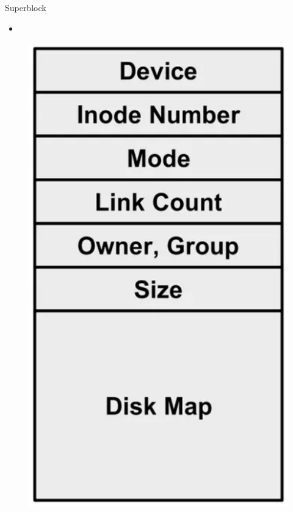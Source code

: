 \documentclass[xcolor=table]{beamer}
\begin{document}
    \begin{frame}[allowframebreaks]{Superblock}
        \begin{itemize}
            \item
        \end{itemize}
        
        \framebreak
        
        \begin{figure}
            \centering
            \includegraphics[width=\textwidth,height=0.8\textheight,keepaspectratio]{images/inode1.png}
            \label{fig:inode1.png}
        \end{figure}
    \end{frame}
    
\end{document}
